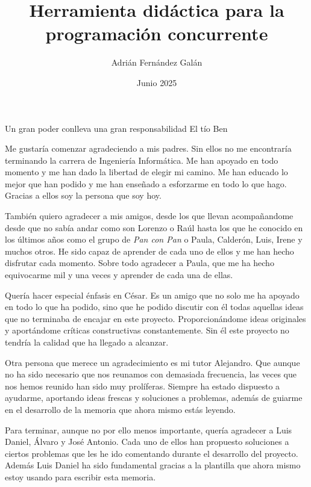 \documentclass[es]{uc3mthesisIEEE}
\title{Herramienta didáctica para la programación concurrente}
\author{Adrián Fernández Galán}
\date{Junio 2025}
\begin{document}
  \makecover


  \makeepigraph
    {Un gran poder conlleva una gran responsabilidad}  %
    {El tío Ben}  %
    {}  %


  \begin{acknowledgements}
    Me gustaría comenzar agradeciendo a mis padres. Sin ellos no me encontraría terminando la carrera de Ingeniería Informática. Me han apoyado en todo momento y me han dado la libertad de elegir mi camino. Me han educado lo mejor que han podido y me han enseñado a esforzarme en todo lo que hago. Gracias a ellos soy la persona que soy hoy. 

    También quiero agradecer a mis amigos, desde los que llevan acompañandome desde que no sabía andar como son Lorenzo o Raúl hasta los que he conocido en los últimos años como el grupo de \textit{Pan con Pan} o Paula, Calderón, Luis, Irene y muchos otros. He sido capaz de aprender de cada uno de ellos y me han hecho disfrutar cada momento. Sobre todo agradecer a Paula, que me ha hecho equivocarme mil y una veces y aprender de cada una de ellas.   
    
    Quería hacer especial énfasis en César. Es un amigo que no solo me ha apoyado en todo lo que ha podido, sino que he podido discutir con él todas aquellas ideas que no terminaba de encajar en este proyecto. Proporcionándome ideas originales y aportándome críticas constructivas constantemente. Sin él este proyecto no tendría la calidad que ha llegado a alcanzar.
    
    Otra persona que merece un agradecimiento es mi tutor Alejandro. Que aunque no ha sido necesario que nos reunamos con demasiada frecuencia, las veces que nos hemos reunido han sido muy prolíferas. Siempre ha estado dispuesto a ayudarme, aportando ideas frescas y soluciones a problemas, además de guiarme en el desarrollo de la memoria que ahora mismo estás leyendo.

    Para terminar, aunque no por ello menos importante, quería agradecer a Luis Daniel, Álvaro y José Antonio. Cada uno de ellos han propuesto soluciones a ciertos problemas que les he ido comentando durante el desarrollo del proyecto. Además Luis Daniel ha sido fundamental gracias a la plantilla que ahora mismo estoy usando para escribir esta memoria.

  \end{acknowledgements}
\end{document}
